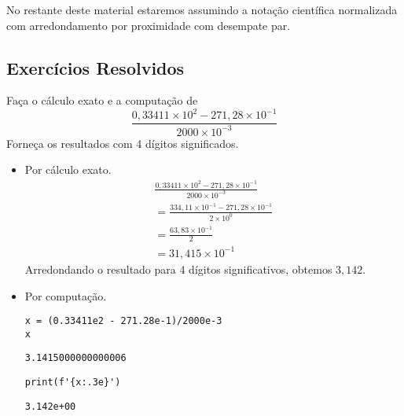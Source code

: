 No restante deste material estaremos assumindo a notação científica normalizada com arredondamento por proximidade com desempate par.

\subsection{Exercícios Resolvidos}

\begin{exeresol}
  Faça o cálculo exato e a computação de
  \begin{equation}
    \frac{0,33411\times 10^2 - 271,28\times 10^{-1}}{2000\times 10^{-3}}
  \end{equation}
  Forneça os resultados com 4 dígitos significados.
\end{exeresol}
\begin{resol}
  \begin{itemize}
  \item Por cálculo exato.
    \begin{gather}
      \frac{0,33411\times 10^2 - 271,28\times 10^{-1}}{2000\times 10^{-3}}\\
      = \frac{334,11\times 10^{-1} - 271,28\times 10^{-1}}{2\times 10^0}\\
      = \frac{63,83\times 10^{-1}}{2}\\
      = 31,415\times 10^{-1}
    \end{gather}
    Arredondando o resultado para 4 dígitos significativos, obtemos $3,142$.
  \item Por computação.

\begin{lstlisting}
x = (0.33411e2 - 271.28e-1)/2000e-3
x
\end{lstlisting}

\begin{verbatim}
3.1415000000000006
\end{verbatim}

\begin{lstlisting}
print(f'{x:.3e}')
\end{lstlisting}

\begin{verbatim}
3.142e+00
\end{verbatim}

  \end{itemize}
\end{resol}

